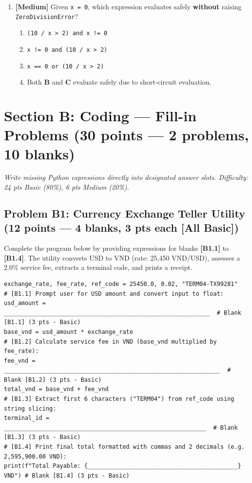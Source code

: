 \documentclass[11pt,a4paper]{article}
\begin{document}
\begin{enumerate}[label=\textbf{Q\arabic*.},leftmargin=1.8em,itemsep=0.7pt,topsep=0.3pt,resume]
\item \textbf{[Medium]} Given \texttt{x = 0}, which expression evaluates safely \textbf{without} raising \texttt{ZeroDivisionError}?
\begin{enumerate}[label=\Alph*.,leftmargin=1.8em]
  \item \texttt{(10 / x > 2) and x != 0}
  \item \texttt{x != 0 and (10 / x > 2)}
  \item \texttt{x == 0 or (10 / x > 2)}
  \item Both \textbf{B} and \textbf{C} evaluate safely due to short-circuit evaluation.
\end{enumerate}

\end{enumerate}

\vspace{-1.5mm}
\section*{Section B: Coding --- Fill-in Problems \hfill \normalsize\normalfont(30 points --- 2 problems, 10 blanks)}
\textit{Write missing Python expressions directly into designated answer slots. Difficulty: 24 pts Basic (80\%), 6 pts Medium (20\%).}

\subsection*{Problem B1: Currency Exchange Teller Utility (12 points --- 4 blanks, 3 pts each [All Basic])}
Complete the program below by providing expressions for blanks \textbf{[B1.1]} to \textbf{[B1.4]}.
The utility converts USD to VND (rate: 25,450 VND/USD), assesses a 2.0\% service fee, extracts a terminal code, and prints a receipt.

\begin{lstlisting}
exchange_rate, fee_rate, ref_code = 25450.0, 0.02, "TERM04-TX99281"
# [B1.1] Prompt user for USD amount and convert input to float:
usd_amount = ___________________________________________________________  # Blank [B1.1] (3 pts - Basic)
base_vnd = usd_amount * exchange_rate
# [B1.2] Calculate service fee in VND (base_vnd multiplied by fee_rate):
fee_vnd = ______________________________________________________________  # Blank [B1.2] (3 pts - Basic)
total_vnd = base_vnd + fee_vnd
# [B1.3] Extract first 6 characters ("TERM04") from ref_code using string slicing:
terminal_id = __________________________________________________________  # Blank [B1.3] (3 pts - Basic)
# [B1.4] Print final total formatted with commas and 2 decimals (e.g. 2,595,900.00 VND):
print(f"Total Payable: {___________________________________________} VND") # Blank [B1.4] (3 pts - Basic)
\end{lstlisting}
\end{document}
